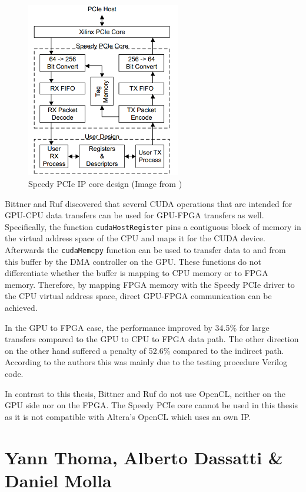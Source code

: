 \begin{figure}[htb]
	  \centerline{
		\includegraphics[width=0.6\textwidth]{images/speedypcie.png}}
	  \caption{Speedy PCIe IP core design (Image from \cite{bittner_speedy})}
	  \label{fig:speedypcie}
\end{figure}


Bittner and Ruf discovered that several CUDA operations that are intended for GPU-CPU data transfers can be used for GPU-FPGA transfers as well.
Specifically, the function \texttt{cudaHostRegister} pins a contiguous block of memory in the virtual address space of the CPU and maps it for the CUDA device.
Afterwards the \texttt{cudaMemcpy} function can be used to transfer data to and from this buffer by the DMA controller on the GPU.
These functions do not differentiate whether the buffer is mapping to CPU memory or to FPGA memory.
Therefore, by mapping FPGA memory with the Speedy PCIe driver to the CPU virtual address space, direct GPU-FPGA communication can be achieved.

In the GPU to FPGA case, the performance improved by 34.5\% for large transfers compared to the GPU to CPU to FPGA data path.
The other direction on the other hand suffered a penalty of 52.6\% compared to the indirect path. According to the authors this was mainly due to the testing procedure Verilog code. \cite{bittner}


In contrast to this thesis, Bittner and Ruf do not use OpenCL, neither on the GPU side nor on the FPGA.
The Speedy PCIe core cannot be used in this thesis as it is not compatible with Altera's OpenCL which uses an own IP.




\section{Yann Thoma, Alberto Dassatti \& Daniel Molla}

